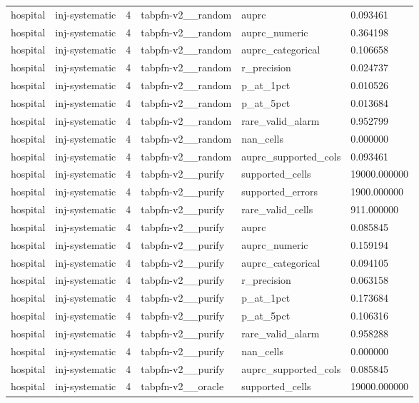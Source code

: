 \begin{tabular}{llllll}
hospital & inj-systematic & 4 & tabpfn-v2\_\_random & auprc & 0.093461 \\
hospital & inj-systematic & 4 & tabpfn-v2\_\_random & auprc\_numeric & 0.364198 \\
hospital & inj-systematic & 4 & tabpfn-v2\_\_random & auprc\_categorical & 0.106658 \\
hospital & inj-systematic & 4 & tabpfn-v2\_\_random & r\_precision & 0.024737 \\
hospital & inj-systematic & 4 & tabpfn-v2\_\_random & p\_at\_1pct & 0.010526 \\
hospital & inj-systematic & 4 & tabpfn-v2\_\_random & p\_at\_5pct & 0.013684 \\
hospital & inj-systematic & 4 & tabpfn-v2\_\_random & rare\_valid\_alarm & 0.952799 \\
hospital & inj-systematic & 4 & tabpfn-v2\_\_random & nan\_cells & 0.000000 \\
hospital & inj-systematic & 4 & tabpfn-v2\_\_random & auprc\_supported\_cols & 0.093461 \\
hospital & inj-systematic & 4 & tabpfn-v2\_\_purify & supported\_cells & 19000.000000 \\
hospital & inj-systematic & 4 & tabpfn-v2\_\_purify & supported\_errors & 1900.000000 \\
hospital & inj-systematic & 4 & tabpfn-v2\_\_purify & rare\_valid\_cells & 911.000000 \\
hospital & inj-systematic & 4 & tabpfn-v2\_\_purify & auprc & 0.085845 \\
hospital & inj-systematic & 4 & tabpfn-v2\_\_purify & auprc\_numeric & 0.159194 \\
hospital & inj-systematic & 4 & tabpfn-v2\_\_purify & auprc\_categorical & 0.094105 \\
hospital & inj-systematic & 4 & tabpfn-v2\_\_purify & r\_precision & 0.063158 \\
hospital & inj-systematic & 4 & tabpfn-v2\_\_purify & p\_at\_1pct & 0.173684 \\
hospital & inj-systematic & 4 & tabpfn-v2\_\_purify & p\_at\_5pct & 0.106316 \\
hospital & inj-systematic & 4 & tabpfn-v2\_\_purify & rare\_valid\_alarm & 0.958288 \\
hospital & inj-systematic & 4 & tabpfn-v2\_\_purify & nan\_cells & 0.000000 \\
hospital & inj-systematic & 4 & tabpfn-v2\_\_purify & auprc\_supported\_cols & 0.085845 \\
hospital & inj-systematic & 4 & tabpfn-v2\_\_oracle & supported\_cells & 19000.000000 \\

\end{tabular}

